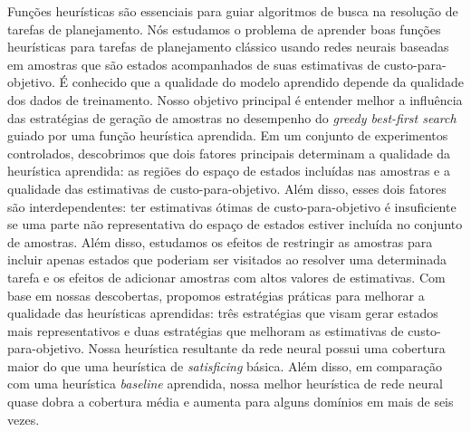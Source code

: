 \begin{translatedabstract}
Funções heurísticas são essenciais para guiar algoritmos de busca na resolução de tarefas de planejamento.
Nós estudamos o problema de aprender boas funções heurísticas para tarefas de planejamento clássico usando redes neurais baseadas em amostras que são estados acompanhados de suas estimativas de custo-para-objetivo. É conhecido que a qualidade do modelo aprendido depende da qualidade dos dados de treinamento. Nosso objetivo principal é entender melhor a influência das estratégias de geração de amostras no desempenho do \emph{greedy best-first search} guiado por uma função heurística aprendida.
Em um conjunto de experimentos controlados, descobrimos que dois fatores principais determinam a qualidade da heurística aprendida: as regiões do espaço de estados incluídas nas amostras e a qualidade das estimativas de custo-para-objetivo. Além disso, esses dois fatores são interdependentes: ter estimativas ótimas de custo-para-objetivo é insuficiente se uma parte não representativa do espaço de estados estiver incluída no conjunto de amostras.
Além disso, estudamos os efeitos de restringir as amostras para incluir apenas estados que poderiam ser visitados ao resolver uma determinada tarefa e os efeitos de adicionar amostras com altos valores de estimativas.
Com base em nossas descobertas, propomos estratégias práticas para melhorar a qualidade das heurísticas aprendidas: três estratégias que visam gerar estados mais representativos e duas estratégias que melhoram as estimativas de custo-para-objetivo.
Nossa heurística resultante da rede neural possui uma cobertura maior do que uma heurística de \emph{satisficing} básica. Além disso, em comparação com uma heurística \emph{baseline} aprendida, nossa melhor heurística de rede neural quase dobra a cobertura média e aumenta para alguns domínios em mais de seis vezes.
\end{translatedabstract}

